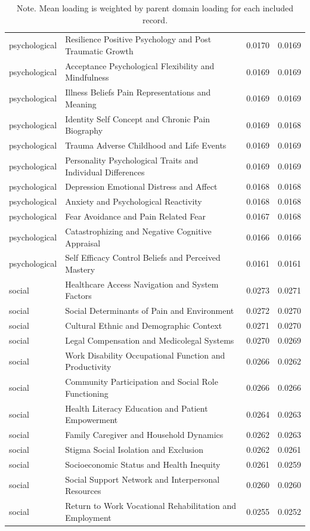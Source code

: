 \begin{table}[htbp]
\begin{tabular}{llll}
psychological & Resilience Positive Psychology and Post Traumatic Growth & 0.0170 & 0.0169 \\
psychological & Acceptance Psychological Flexibility and Mindfulness & 0.0169 & 0.0169 \\
psychological & Illness Beliefs Pain Representations and Meaning & 0.0169 & 0.0169 \\
psychological & Identity Self Concept and Chronic Pain Biography & 0.0169 & 0.0168 \\
psychological & Trauma Adverse Childhood and Life Events & 0.0169 & 0.0169 \\
psychological & Personality Psychological Traits and Individual Differences & 0.0169 & 0.0169 \\
psychological & Depression Emotional Distress and Affect & 0.0168 & 0.0168 \\
psychological & Anxiety and Psychological Reactivity & 0.0168 & 0.0168 \\
psychological & Fear Avoidance and Pain Related Fear & 0.0167 & 0.0168 \\
psychological & Catastrophizing and Negative Cognitive Appraisal & 0.0166 & 0.0166 \\
psychological & Self Efficacy Control Beliefs and Perceived Mastery & 0.0161 & 0.0161 \\
social & Healthcare Access Navigation and System Factors & 0.0273 & 0.0271 \\
social & Social Determinants of Pain and Environment & 0.0272 & 0.0270 \\
social & Cultural Ethnic and Demographic Context & 0.0271 & 0.0270 \\
social & Legal Compensation and Medicolegal Systems & 0.0270 & 0.0269 \\
social & Work Disability Occupational Function and Productivity & 0.0266 & 0.0262 \\
social & Community Participation and Social Role Functioning & 0.0266 & 0.0266 \\
social & Health Literacy Education and Patient Empowerment & 0.0264 & 0.0263 \\
social & Family Caregiver and Household Dynamics & 0.0262 & 0.0263 \\
social & Stigma Social Isolation and Exclusion & 0.0262 & 0.0261 \\
social & Socioeconomic Status and Health Inequity & 0.0261 & 0.0259 \\
social & Social Support Network and Interpersonal Resources & 0.0260 & 0.0260 \\
social & Return to Work Vocational Rehabilitation and Employment & 0.0255 & 0.0252 \\
\bottomrule
\end{tabular}

\caption*{Note. Mean loading is weighted by parent domain loading for each included record.}
\end{table}
